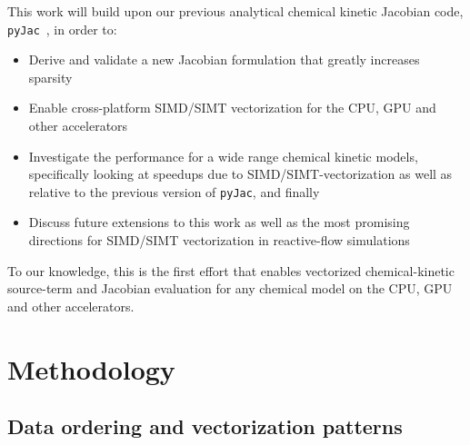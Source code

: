 \documentclass[12pt,number,sort&compress,preprint]{elsarticle}
\begin{document}
This work will build upon our previous analytical chemical kinetic Jacobian code, \texttt{pyJac}~\cite{Niemeyer:2016aa}, in order to:
\begin{itemize}
 \item Derive and validate a new Jacobian formulation that greatly increases sparsity
 \item Enable cross-platform SIMD\slash SIMT vectorization for the CPU, GPU and other accelerators
 \item Investigate the performance for a wide range chemical kinetic models, specifically looking at speedups due to SIMD\slash SIMT-vectorization as well as relative to the previous version of \texttt{pyJac}, and finally
 \item Discuss future extensions to this work as well as the most promising directions for SIMD\slash SIMT vectorization in reactive-flow simulations
\end{itemize}
To our knowledge, this is the first effort that enables vectorized chemical-kinetic source-term and Jacobian evaluation for any chemical model on the CPU, GPU and other accelerators.

\section{Methodology}
\subsection{Data ordering and vectorization patterns}
\label{S:data}
\end{document}
